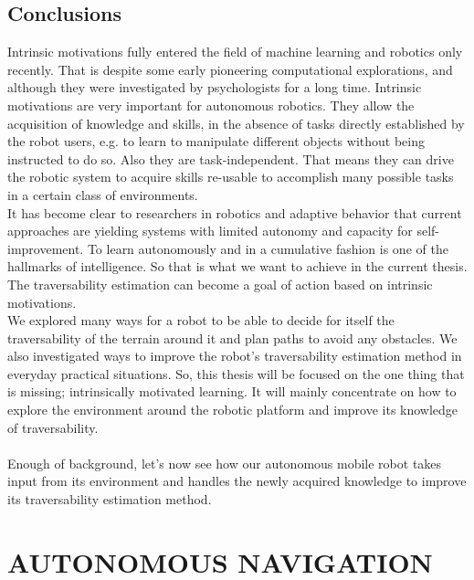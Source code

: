 \documentclass[12pt,a4paper,table,dvipsnames,tikz]{report}
\begin{document}
	\section{Conclusions}
	\label{sec:bg:concl}
	
	Intrinsic motivations fully entered the field of machine learning and robotics 
	only recently. That is despite some early pioneering computational explorations, 
	and although they were investigated by psychologists for a long time. Intrinsic 
	motivations are very important for autonomous robotics. They allow the acquisition 
	of knowledge and skills, in the absence of tasks directly established by the robot 
	users, e.g. to learn to manipulate different objects without being instructed to 
	do so. Also they are task-independent. That means they can drive the robotic system 
	to acquire skills re-usable to accomplish many possible tasks in a certain class 
	of environments.
	\\
	
	It has become clear to researchers in robotics and adaptive behavior that 
	current approaches are yielding systems with limited autonomy and capacity for 
	self-improvement. To learn autonomously and in a cumulative fashion is one of 
	the hallmarks of intelligence. So that is what we want to achieve in the current 
	thesis. The traversability estimation can become a goal of action based on 
	intrinsic motivations.
	\\
	
	We explored many ways for a robot to be able to decide for itself the 
	traversability of the terrain around it and plan paths to avoid any obstacles. 
	We also investigated ways to improve the robot's traversability estimation 
	method in everyday practical situations. So, this thesis will be focused on the 
	one thing that is missing; intrinsically motivated learning. It will mainly 
	concentrate on how to explore the environment around the robotic platform and 
	improve its knowledge of traversability.
	\\\\
	
	Enough of background, let’s now see how our autonomous mobile robot takes input 
	from its environment and handles the newly acquired knowledge to improve its 
	traversability estimation method.
	\\
	
	
	\chapter{AUTONOMOUS NAVIGATION}
	\label{sec:fg}
	
\end{document}
